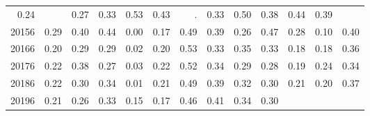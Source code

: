 \begin{table}[!h]
\begin{tabular}{lllllllllllll}
  \multicolumn{1}{|r}{0.24} &
  \multicolumn{1}{r}{} &
  \multicolumn{1}{r}{0.27} &
  \multicolumn{1}{r}{0.33} &
  \multicolumn{1}{r}{0.53} &
  \multicolumn{1}{r}{0.43} &
  \multicolumn{1}{r}{.} &
  \multicolumn{1}{r}{0.33} &
  \multicolumn{1}{r}{0.50} &
  \multicolumn{1}{r}{0.38} &
  \multicolumn{1}{r}{0.44} &
  \multicolumn{1}{r}{0.39} \\
\multicolumn{1}{l}{\hspace{1em}20156} &
  \multicolumn{1}{|r}{0.29} &
  \multicolumn{1}{r}{0.40} &
  \multicolumn{1}{r}{0.44} &
  \multicolumn{1}{r}{0.00} &
  \multicolumn{1}{r}{0.17} &
  \multicolumn{1}{r}{0.49} &
  \multicolumn{1}{r}{0.39} &
  \multicolumn{1}{r}{0.26} &
  \multicolumn{1}{r}{0.47} &
  \multicolumn{1}{r}{0.28} &
  \multicolumn{1}{r}{0.10} &
  \multicolumn{1}{r}{0.40} \\
\multicolumn{1}{l}{\hspace{1em}20166} &
  \multicolumn{1}{|r}{0.20} &
  \multicolumn{1}{r}{0.29} &
  \multicolumn{1}{r}{0.29} &
  \multicolumn{1}{r}{0.02} &
  \multicolumn{1}{r}{0.20} &
  \multicolumn{1}{r}{0.53} &
  \multicolumn{1}{r}{0.33} &
  \multicolumn{1}{r}{0.35} &
  \multicolumn{1}{r}{0.33} &
  \multicolumn{1}{r}{0.18} &
  \multicolumn{1}{r}{0.18} &
  \multicolumn{1}{r}{0.36} \\
\multicolumn{1}{l}{\hspace{1em}20176} &
  \multicolumn{1}{|r}{0.22} &
  \multicolumn{1}{r}{0.38} &
  \multicolumn{1}{r}{0.27} &
  \multicolumn{1}{r}{0.03} &
  \multicolumn{1}{r}{0.22} &
  \multicolumn{1}{r}{0.52} &
  \multicolumn{1}{r}{0.34} &
  \multicolumn{1}{r}{0.29} &
  \multicolumn{1}{r}{0.28} &
  \multicolumn{1}{r}{0.19} &
  \multicolumn{1}{r}{0.24} &
  \multicolumn{1}{r}{0.34} \\
\multicolumn{1}{l}{\hspace{1em}20186} &
  \multicolumn{1}{|r}{0.22} &
  \multicolumn{1}{r}{0.30} &
  \multicolumn{1}{r}{0.34} &
  \multicolumn{1}{r}{0.01} &
  \multicolumn{1}{r}{0.21} &
  \multicolumn{1}{r}{0.49} &
  \multicolumn{1}{r}{0.39} &
  \multicolumn{1}{r}{0.32} &
  \multicolumn{1}{r}{0.30} &
  \multicolumn{1}{r}{0.21} &
  \multicolumn{1}{r}{0.20} &
  \multicolumn{1}{r}{0.37} \\
\multicolumn{1}{l}{\hspace{1em}20196} &
  \multicolumn{1}{|r}{0.21} &
  \multicolumn{1}{r}{0.26} &
  \multicolumn{1}{r}{0.33} &
  \multicolumn{1}{r}{0.15} &
  \multicolumn{1}{r}{0.17} &
  \multicolumn{1}{r}{0.46} &
  \multicolumn{1}{r}{0.41} &
  \multicolumn{1}{r}{0.34} &
  \multicolumn{1}{r}{0.30} &

\end{tabular}
\end{table}
